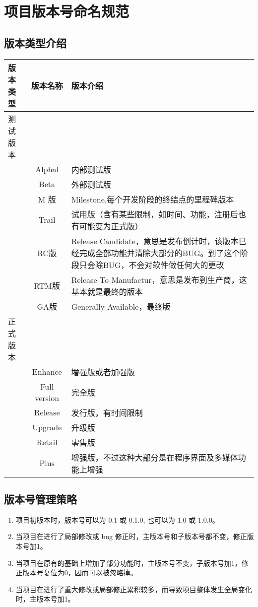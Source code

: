 \section{项目版本号命名规范}
\subsection{版本类型介绍}
\begin{center}
	\begin{tabular}{|l|c|p{10cm}|}  
		\hline
		版本类型 & 版本名称 & 版本介绍 \\ \hline
		测试版本 & & \\ \hline
		& Alphal & 内部测试版 \\ \hline
		& Beta & 外部测试版 \\ \hline
		& M 版 & Milestone,每个开发阶段的终结点的里程碑版本 \\ \hline
		& Trail & 试用版（含有某些限制，如时间、功能，注册后也有可能变为正式版） \\ \hline
		& RC版 & Release Candidate，意思是发布倒计时，该版本已经完成全部功能并清除大部分的BUG。到了这个阶段只会除BUG，不会对软件做任何大的更改 \\ \hline
		& RTM版 & Release To Manufactur，意思是发布到生产商，这基本就是最终的版本 \\ \hline
		& GA版 & Generally Available，最终版 \\ \hline
		正式版本 & & \\ \hline
		& Enhance & 增强版或者加强版 \\ \hline
		& Full version & 完全版 \\ \hline
		& Release & 发行版，有时间限制 \\ \hline
		& Upgrade & 升级版 \\ \hline
		& Retail & 零售版 \\ \hline
		& Plus & 增强版，不过这种大部分是在程序界面及多媒体功能上增强 \\ \hline
	\end{tabular}
\end{center}

\subsection{版本号管理策略}
\begin{enumerate}
\item 项目初版本时，版本号可以为 0.1 或 0.1.0, 也可以为 1.0 或 1.0.0。
\item 当项目在进行了局部修改或 bug 修正时，主版本号和子版本号都不变，修正版本号加1。
\item 当项目在原有的基础上增加了部分功能时，主版本号不变，子版本号加1，修正版本号复位为0，因而可以被忽略掉。
\item 当项目在进行了重大修改或局部修正累积较多，而导致项目整体发生全局变化时，主版本号加1。
\end{enumerate}
